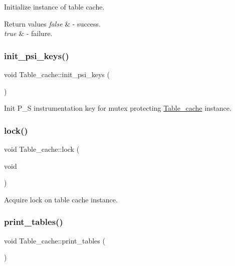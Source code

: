 Initialize instance of table cache.


\begin{DoxyRetVals}{Return values}
{\em false} & -\/ success. \\
\hline
{\em true} & -\/ failure. \\
\hline
\end{DoxyRetVals}
\mbox{\label{classTable__cache_ab87a81918be08e180793e64050a94564}} 
\subsubsection{\texorpdfstring{init\+\_\+psi\+\_\+keys()}{init\_psi\_keys()}}
{\footnotesize\ttfamily void Table\+\_\+cache\+::init\+\_\+psi\+\_\+keys (\begin{DoxyParamCaption}{ }\end{DoxyParamCaption})\hspace{0.3cm}{\ttfamily [static]}}

Init P\+\_\+S instrumentation key for mutex protecting \mbox{\hyperlink{classTable__cache}{Table\+\_\+cache}} instance. \mbox{\label{classTable__cache_a04900b8af1fb846ca4110593291c0447}} 
\subsubsection{\texorpdfstring{lock()}{lock()}}
{\footnotesize\ttfamily void Table\+\_\+cache\+::lock (\begin{DoxyParamCaption}\item[{void}]{ }\end{DoxyParamCaption})\hspace{0.3cm}{\ttfamily [inline]}}

Acquire lock on table cache instance. \mbox{\label{classTable__cache_ad83b8dd133dfe3b3091124d1a75ff693}} 
\subsubsection{\texorpdfstring{print\+\_\+tables()}{print\_tables()}}
{\footnotesize\ttfamily void Table\+\_\+cache\+::print\+\_\+tables (\begin{DoxyParamCaption}{ }\end{DoxyParamCaption})}

